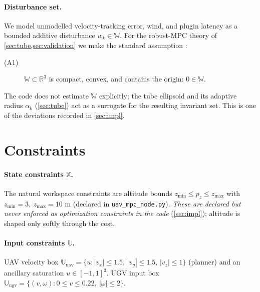 \documentclass[11pt]{article}
\newcommand{\R}{\mathbb{R}}
\newcommand{\W}{\mathbb{W}}
\newcommand{\Xset}{\mathbb{X}}
\newcommand{\Uset}{\mathbb{U}}
\newcommand{\code}[1]{\texttt{#1}}
\begin{document}
\paragraph{Disturbance set.} We model unmodelled velocity-tracking error, wind, and plugin latency as a
bounded additive disturbance $w_k\in\W$. For the robust-MPC theory of \cref{sec:tube,sec:validation} we make
the standard assumption \citep{mayne2005robust}:
\begin{description}
\item[\textnormal{(A1)}] $\W\subset\R^3$ is compact, convex, and contains the origin: $0\in\W$.
\end{description}
The code does not estimate $\W$ explicitly; the tube ellipsoid and its adaptive radius $\alpha_k$
(\cref{sec:tube}) act as a surrogate for the resulting invariant set. This is one of the deviations recorded
in \cref{sec:impl}.

\section{Constraints}
\label{sec:constraints}

\paragraph{State constraints $\Xset$.} The natural workspace constraints are altitude bounds
$z_{\min}\le p_z\le z_{\max}$ with $z_{\min}=3,\ z_{\max}=10$ m (declared in \code{uav\_mpc\_node.py}).
\emph{These are declared but never enforced as optimization constraints in the code} (\cref{sec:impl});
altitude is shaped only softly through the cost.

\paragraph{Input constraints $\Uset$.} UAV velocity box
$\Uset_{\text{uav}}=\{u: |v_x|\le1.5,\,|v_y|\le1.5,\,|v_z|\le1\}$ (planner) and an ancillary saturation
$u\in[-1,1]^3$. UGV input box $\Uset_{\text{ugv}}=\{(v,\omega): 0\le v\le0.22,\ |\omega|\le2\}$.
\end{document}
